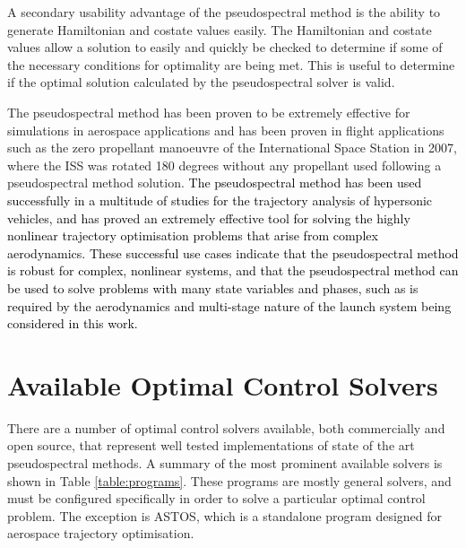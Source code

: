 A secondary usability advantage of the pseudospectral method is the ability to generate Hamiltonian and costate values easily\cite{Gong2010,Fahroo2001,Rao2009}. The Hamiltonian and costate values allow a solution to easily and quickly be checked to determine if some of the necessary conditions for optimality are being met. This is useful to determine if the optimal solution calculated by the pseudospectral solver is valid.


The pseudospectral method has been proven to be extremely effective for simulations in aerospace applications and has been proven in flight applications such as the zero propellant manoeuvre of the International Space Station in 2007, where the ISS was rotated 180 degrees without any propellant used following a pseudospectral method solution\cite{Bedrossian}. 
\textcolor{black}{
The pseudospectral method has been used successfully in a multitude of studies for the trajectory analysis of hypersonic vehicles\cite{Li2012,Josselyn2002a,Zhao2013,Tian2011,Darby2011,Chai2015,Rizvi2015,Moshman2014,Yang2017,Kodera2014}, and has proved an extremely effective tool for solving the highly nonlinear trajectory optimisation problems that arise from complex aerodynamics. 
These successful use cases indicate that the pseudospectral method is robust for complex, nonlinear systems, and that the pseudospectral method can be used to solve problems with many state variables and phases, such as is required by the aerodynamics and multi-stage nature of the launch system being considered in this work.
}
\section{Available Optimal Control Solvers}\label{sec:optsolvers}

There are a number of optimal control solvers available, both commercially and open source, that represent well tested implementations of state of the art pseudospectral methods. A summary of the most prominent available solvers is shown in Table \ref{table:programs}. These programs are mostly general solvers, and must be configured specifically in order to solve a particular optimal control problem. The exception is ASTOS\cite{astos}, which is a standalone program designed for aerospace trajectory optimisation.

